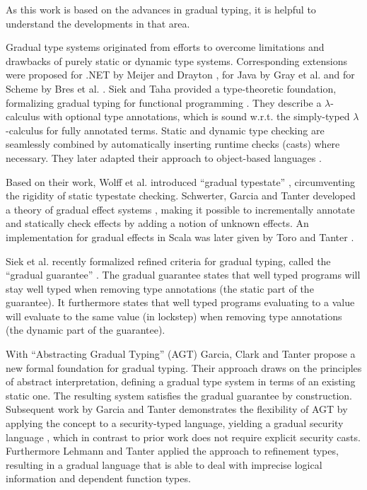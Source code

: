As this work is based on the advances in gradual typing, it is helpful to understand the developments in that area.

Gradual type systems originated from efforts to overcome limitations and drawbacks of purely static or dynamic type systems.
Corresponding extensions were proposed for .NET by Meijer and Drayton \cite{meijer2004static}, for Java by Gray et al. \cite{gray2005fine} and for Scheme by Bres et al. \cite{bres2004compiling}.
Siek and Taha provided a type-theoretic foundation, formalizing gradual typing for functional programming \cite{siek2006gradual}.
They describe a $\lambda$-calculus with optional type annotations, which is sound w.r.t. the simply-typed $\lambda$-calculus for fully annotated terms.
Static and dynamic type checking are seamlessly combined by automatically inserting runtime checks (casts) where necessary.
They later adapted their approach to object-based languages \cite{siek2007gradual}.

Based on their work, Wolff et al. introduced “gradual typestate” \cite{wolff2011gradual}, circumventing the rigidity of static typestate checking.
Schwerter, Garcia and Tanter developed a theory of gradual effect systems \cite{banados2014theory}, making it possible to incrementally annotate and statically check effects by adding a notion of unknown effects.
An implementation for gradual effects in Scala was later given by Toro and Tanter \cite{toro2015customizable}.

\label{grad-guarantee}
Siek et al. recently formalized refined criteria for gradual typing, called the “gradual guarantee” \cite{siek2015refined}.
The gradual guarantee states that well typed programs will stay well typed when removing type annotations (the static part of the guarantee).
It furthermore states that well typed programs evaluating to a value will evaluate to the same value (in lockstep) when removing type annotations (the dynamic part of the guarantee).

With “Abstracting Gradual Typing” (AGT) \cite{garcia2016abstracting} Garcia, Clark and Tanter propose a new formal foundation for gradual typing.
Their approach draws on the principles of abstract interpretation, defining a gradual type system in terms of an existing static one.
The resulting system satisfies the gradual guarantee by construction.
Subsequent work by Garcia and Tanter demonstrates the flexibility of AGT by applying the concept to a security-typed language, yielding a gradual security language \cite{garcia2015deriving}, which in contrast to prior work does not require explicit security casts.
Furthermore Lehmann and Tanter \cite{nico} applied the approach to refinement types, resulting in a gradual language that is able to deal with imprecise logical information and dependent function types.